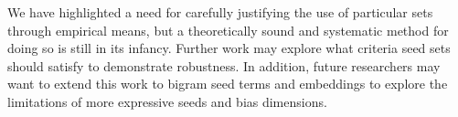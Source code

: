 We have highlighted a need for carefully justifying the use of particular sets through empirical
means, but a theoretically sound and systematic method for doing so is still in its infancy. Further
work may explore what criteria seed sets should satisfy to demonstrate robustness. In addition,
future researchers may want to extend this work to bigram seed terms and embeddings to explore the
limitations of more expressive seeds and bias dimensions.
